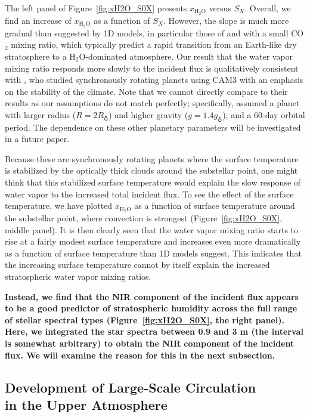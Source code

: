 \documentclass[11pt,numberedappendix,twocolappendix,]{emulateapj}
\def\water{H$_2$O}
\def\xwater{$x_\text{\water}$}
\def\wv{water vapor}
\def\revise#1{{\bf #1}}
\begin{document}
The left panel of Figure~\ref{fig:xH2O_S0X} presents \xwater{} versus $S_X$. 
Overall, we find an increase of \xwater{} as a function of $S_X$. 
However, the slope is much more gradual than suggested by 1D models, in particular those  of \citet{Kasting1993} and \citet{Wordsworth2013} with a small CO$_2$ mixing ratio, which typically predict a rapid transition from an Earth-like dry stratosphere to a \water{}-dominated atmosphere. 
Our result that the \wv{} mixing ratio responds more slowly to the incident flux is qualitatively consistent with \citet{Yang2013}, who studied synchronously rotating planets using CAM3 with an emphasis on the stability of the climate. 
Note that we cannot directly compare to their results as our assumptions do not match perfectly; specifically, \cite{Yang2013} assumed a planet with larger radius ($R=2R_\earth$) and higher gravity ($g=1.4g_\earth$), and a 60-day orbital period. 
The dependence on these other planetary parameters will be investigated in a future paper. 

Because these are synchronously rotating planets where the surface temperature is stabilized by the optically thick clouds around the substellar point, one might think that this stabilized surface temperature would explain the slow  response of \wv{} to the increased total incident flux. 
To see the effect of the surface temperature, we have plotted \xwater{} as a function of surface temperature around the substellar point, where convection is strongest (Figure~\ref{fig:xH2O_S0X}, middle panel). 
It is then clearly seen that the \wv{}  mixing ratio starts to rise at a fairly modest surface temperature and increases even more dramatically as a function of surface temperature than 1D models suggest. 
This indicates that the increasing surface temperature cannot by itself explain the increased stratospheric \wv{} mixing ratios. %

\revise{Instead, we find that the NIR component of the incident flux appears to be a good predictor of stratospheric humidity across the full range of stellar spectral types (Figure~\ref{fig:xH2O_S0X}, the right panel). %
Here, we integrated the star spectra between 0.9 and 3 \textmu m (the interval is somewhat arbitrary) to obtain the NIR component of the incident flux. %
We will examine the reason for this in the next subsection.}
 

\subsection{Development of Large-Scale Circulation \\in the Upper Atmosphere}
\label{ss:result_omega}
\end{document}
